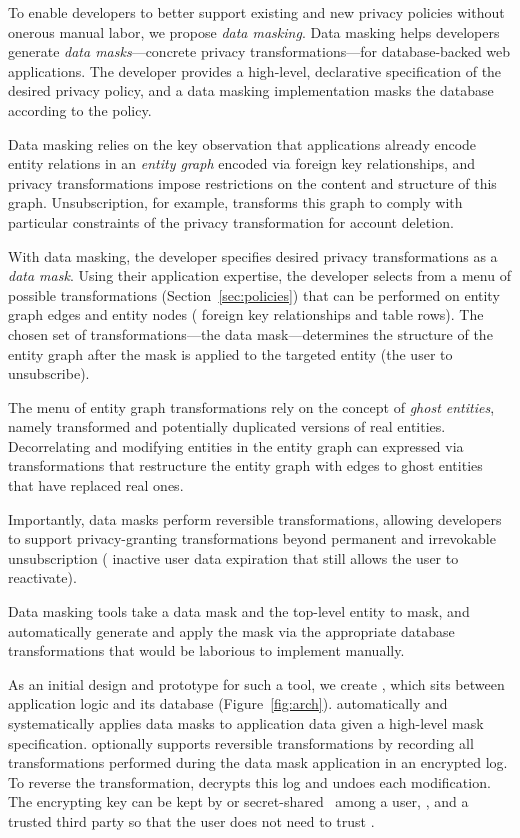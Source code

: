To enable developers to better support existing and new privacy policies without onerous manual
labor, we propose \emph{data masking}.
%
Data masking helps developers generate \emph{data masks}---concrete privacy transformations---for
database-backed web applications. The developer provides a high-level, declarative specification of
the desired privacy policy, and a data masking implementation masks the database according to the
policy.

Data masking relies on the key observation that applications already encode entity relations in an
\emph{entity graph} encoded via \eg foreign key relationships, and privacy transformations impose
restrictions on the content and structure of this graph. Unsubscription, for example, transforms
this graph to comply with particular constraints of the privacy transformation for account deletion.

With data masking, the developer specifies desired privacy transformations as a \emph{data mask}.
Using their application expertise, the developer selects from a menu of possible transformations
(Section~\ref{sec:policies}) that can be performed on entity graph edges and entity nodes (\eg
foreign key relationships and table rows). The chosen set of transformations---the data
mask---determines the structure of the entity graph after the mask is applied to the targeted entity
(\eg the user to unsubscribe).

The menu of entity graph transformations rely on the concept of \emph{ghost entities}, namely
transformed and potentially duplicated versions of real entities. Decorrelating and modifying
entities in the entity graph can expressed via transformations that restructure the entity graph
with edges to ghost entities that have replaced real ones.

Importantly, data masks perform reversible transformations, allowing developers to support
privacy-granting transformations beyond permanent and irrevokable unsubscription (\eg
inactive user data expiration that still allows the user to reactivate).

Data masking tools take a data mask and the top-level entity to mask, and automatically generate and
apply the mask via the appropriate database transformations that would be laborious to implement
manually.

As an initial design and prototype for such a tool, we create \sys, which sits between application
logic and its database (Figure~\ref{fig:arch}). 
\sys automatically and systematically applies data masks to application data given a high-level
mask specification.
\sys optionally supports reversible transformations by recording all transformations performed during the data
mask application in an encrypted log. To reverse the transformation, \sys decrypts this log and
undoes each modification.
The encrypting key can be kept by \sys or secret-shared~\cite{secretsharing} among a
user, \sys, and a trusted third party so that the user does not need to trust \sys.

